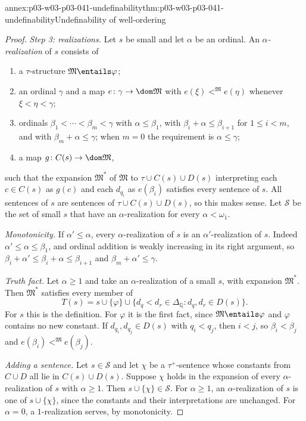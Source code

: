 \begin{annexitem}{annex:p03-w03-p03-041-undefinability}{thm:p03-w03-p03-041-undefinability}{Undefinability of well-ordering}
\begin{proof}
\emph{Step 3: realizations.} Let \(s\) be small and let \(\alpha\) be an
ordinal. An \emph{\(\alpha\)-realization} of \(s\) consists of
\begin{enumerate}
\item a \(\tau\)-structure \(\mathfrak M\entails\varphi\);
\item an ordinal \(\gamma\) and a map \(e\colon\gamma\to\dom\mathfrak M\)
      with \(e(\xi)<^{\mathfrak M}e(\eta)\) whenever \(\xi<\eta<\gamma\);
\item ordinals \(\beta_1<\cdots<\beta_m<\gamma\) with
      \(\alpha\leq\beta_1\), with \(\beta_i+\alpha\leq\beta_{i+1}\) for
      \(1\leq i<m\), and with \(\beta_m+\alpha\leq\gamma\); when \(m=0\)
      the requirement is \(\alpha\leq\gamma\);
\item a map \(g\colon C(s)\to\dom\mathfrak M\),
\end{enumerate}
such that the expansion \(\mathfrak M^{\ast}\) of \(\mathfrak M\) to
\(\tau\cup C(s)\cup D(s)\) interpreting each \(c\in C(s)\) as \(g(c)\) and
each \(d_{q_i}\) as \(e(\beta_i)\) satisfies every sentence of \(s\). All
sentences of \(s\) are sentences of \(\tau\cup C(s)\cup D(s)\), so this
makes sense. Let \(\mathcal S\) be the set of small \(s\) that have an
\(\alpha\)-realization for every \(\alpha<\omega_1\).

\emph{Monotonicity.} If \(\alpha'\leq\alpha\), every
\(\alpha\)-realization of \(s\) is an \(\alpha'\)-realization of \(s\).
Indeed \(\alpha'\leq\alpha\leq\beta_1\), and ordinal addition is weakly
increasing in its right argument, so
\(\beta_i+\alpha'\leq\beta_i+\alpha\leq\beta_{i+1}\) and
\(\beta_m+\alpha'\leq\gamma\).

\emph{Truth fact.} Let \(\alpha\geq1\) and take an \(\alpha\)-realization
of a small \(s\), with expansion \(\mathfrak M^{\ast}\). Then
\(\mathfrak M^{\ast}\) satisfies every member of
\[
 T(s)=s\cup\{\varphi\}\cup\{d_q<d_r\in\Delta_{\mathbb Q}:d_q,d_r\in D(s)\}.
\]
For \(s\) this is the definition. For \(\varphi\) it is the first fact,
since \(\mathfrak M\entails\varphi\) and \(\varphi\) contains no new
constant. If \(d_{q_i},d_{q_j}\in D(s)\) with \(q_i<q_j\), then \(i<j\),
so \(\beta_i<\beta_j\) and \(e(\beta_i)<^{\mathfrak M}e(\beta_j)\).

\emph{Adding a sentence.} Let \(s\in\mathcal S\) and let \(\chi\) be a
\(\tau^{+}\)-sentence whose constants from \(C\cup D\) all lie in
\(C(s)\cup D(s)\). Suppose \(\chi\) holds in the expansion of every
\(\alpha\)-realization of \(s\) with \(\alpha\geq1\). Then
\(s\cup\{\chi\}\in\mathcal S\). For \(\alpha\geq1\), an
\(\alpha\)-realization of \(s\) is one of \(s\cup\{\chi\}\), since the
constants and their interpretations are unchanged. For \(\alpha=0\), a
\(1\)-realization serves, by monotonicity.


\end{proof}
\end{annexitem}
